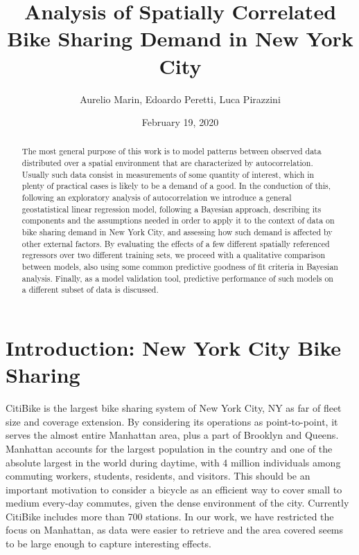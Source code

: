 \documentclass[12pt]{article}
\begin{document}
	\title{%
		Analysis of Spatially Correlated Bike Sharing Demand in New York City \\ \vspace{3 mm}}
	\author{Aurelio Marin, Edoardo Peretti, Luca Pirazzini}
	\date{February 19, 2020}
	
	\maketitle
\vspace{10 mm}

\begin{abstract}
	The most general purpose of this work is to model patterns between observed data distributed over a spatial environment that are characterized by autocorrelation. Usually such data consist in measurements of some quantity of interest, which in plenty of practical cases is likely to be a demand of a good. 
	In the conduction of this, following an exploratory analysis of autocorrelation we introduce a general geostatistical linear regression model, following a Bayesian approach, describing its components and the assumptions needed in order to apply it to the context of data on bike sharing demand in New York City, and assessing how such demand is affected by other external factors. 
	By evaluating the effects of a few different spatially referenced regressors over two different training sets, we proceed with a qualitative comparison between models, also using some common predictive goodness of fit criteria in Bayesian analysis. Finally, as a model validation tool, predictive performance of such models on a different subset of data is discussed.
\end{abstract}	

\newpage
\tableofcontents

\newpage
\section{Introduction: New York City Bike Sharing}
\noindent
CitiBike \cite{stationdata} is the largest bike sharing system of New York City, NY as far of fleet size and coverage extension. By considering its operations as point-to-point, it serves the almost entire Manhattan area, plus a part of Brooklyn and Queens. Manhattan accounts for the largest population in the country and one of the absolute largest in the world during daytime, with 4 million individuals among commuting workers, students, residents, and visitors. This should be an important motivation to consider a bicycle as an efficient way to cover small to medium every-day commutes, given the dense environment of the city. Currently CitiBike includes more than 700 stations. In our work, we have restricted the focus on Manhattan, as data were easier to retrieve and the area covered seems to be large enough to capture interesting effects.\\
\end{document}

